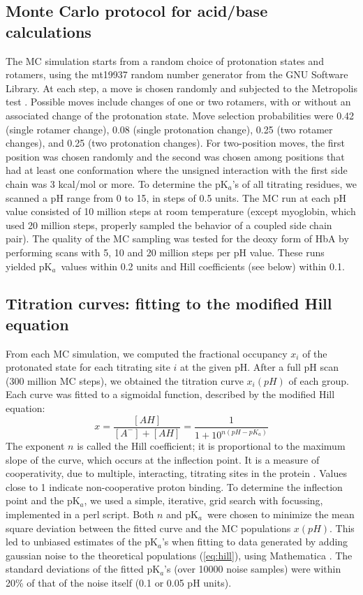\documentclass[a4paper,12pt]{article}
\newcommand{\pk}{pK$_a$}
\begin{document}
\subsection{Monte Carlo protocol for acid/base calculations}
The MC simulation starts from a random choice of protonation states and rotamers, using the mt19937 random number
generator from the GNU Software Library. At each step, a move is chosen randomly and subjected to the Metropolis
test \cite{Polydorides13,AllenBK,FrenkelBK}. Possible moves include changes of one or two rotamers, with or without
an associated change of the protonation state. Move selection probabilities were 0.42 (single rotamer change), 0.08
(single protonation change), 0.25 (two rotamer changes), and 0.25 (two protonation changes). For two-position moves,
the first position was chosen randomly and the second was chosen among positions that had at least one conformation
where the unsigned interaction with the first side chain was 3 kcal/mol or more. To determine the \pk's of all titrating
residues, we scanned a pH range from 0 to 15, in steps of 0.5 units. The MC run at each pH value consisted of 10 million
steps at room temperature (except myoglobin, which used 20 million steps, properly sampled the behavior of a coupled
side chain pair). The quality of the MC sampling was tested for the deoxy form of HbA by performing scans with 5, 10
and 20 million steps per pH value. These runs yielded \pk\ values within 0.2 units and Hill coefficients (see below)
within 0.1.

\subsection{Titration curves: fitting to the modified Hill equation}
From each MC simulation, we computed the fractional occupancy $x_i$ of the protonated state for each titrating site
$i$ at the given pH. After a full pH scan (300 million MC steps), we obtained the titration curve $x_i(pH)$  of each
group. Each curve was fitted to a sigmoidal function, described by the modified Hill equation: 
\begin{equation} \label{eq:hill}
x=\frac{[AH]}{[A^-]+[AH]}=\frac{1}{1+10^{n(pH - pK_a)}} 
\end{equation}
The exponent $n$ is called the Hill coefficient; it is proportional to the maximum slope of the curve, which occurs
at the inflection point. It is a measure of cooperativity, due to multiple, interacting, titrating sites in the protein
\cite{Onufriev01}. Values close to 1 indicate non-cooperative proton binding. To determine the inflection point and the
\pk, we used a simple, iterative, grid search with focussing, implemented in a perl script. Both $n$ and \pk\ were chosen
to minimize the mean square deviation between the fitted curve and the MC populations $x(pH)$. This led to unbiased
estimates of the \pk's when fitting to data generated by adding gaussian noise to the theoretical populations (\ref{eq:hill}),
using Mathematica \cite{MMA}. The standard deviations of the fitted \pk's (over 10000 noise samples) were within 20\% of
that of the noise itself (0.1 or 0.05 pH units). 
\end{document}
